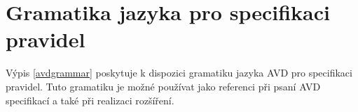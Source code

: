 \section{Gramatika jazyka pro specifikaci pravidel}
\label{avd_grammar}
Výpis \ref{avdgrammar} poskytuje k dispozici gramatiku jazyka AVD pro specifikaci pravidel. Tuto gramatiku je možné používat jako referenci při psaní AVD specifikací a také při realizaci rozšíření.
\vspace{0.5cm}

